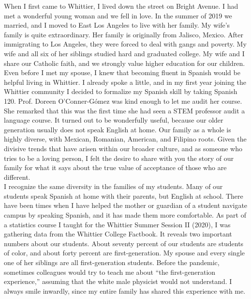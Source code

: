 \documentclass[../../main.tex]{subfiles}
\begin{document}
When I first came to Whittier, I lived down the street on Bright Avenue.  I had met a wonderful young woman and we fell in love.  In the summer of 2019 we married, and I moved to East Los Angeles to live with her family.  My wife's family is quite extraordinary.  Her family is originally from Jalisco, Mexico.  After immigrating to Los Angeles, they were forced to deal with gangs and poverty.  My wife and all six of her siblings studied hard and graduated college.  My wife and I share our Catholic faith, and we strongly value higher education for our children.
\\
\vspace{0.15cm}
Even before I met my spouse, I knew that becoming fluent in Spanish would be helpful living in Whittier.  I already spoke a little, and in my first year joining the Whittier community I decided to formalize my Spanish skill by taking Spanish 120. Prof. Doreen O'Conner-G\'{o}mez was kind enough to let me audit her course.  She remarked that this was the first time she had seen a STEM professor audit a language course.  It turned out to be wonderfully useful, because our older generation usually does not speak English at home.  Our family as a whole is highly diverse, with Mexican, Romanian, American, and Filipino roots.  Given the divisive trends that have arisen within our broader culture, and as someone who tries to be a loving person, I felt the desire to share with you the story of our family for what it says about the true value of acceptance of those who are different.
\\
\vspace{0.15cm}
I recognize the same diversity in the families of my students.  Many of our students speak Spanish at home with their parents, but English at school.  There have been times when I have helped the mother or guardian of a student navigate campus by speaking Spanish, and it has made them more comfortable.  As part of a statistics course I taught for the Whittier Summer Session II (2020), I was gathering data from the Whittier College Factbook.  It reveals two important numbers about our students.  About seventy percent of our students are students of color, and about forty percent are first-generation.  My spouse and every single one of her siblings are all first-generation students.  Before the pandemic, sometimes colleagues would try to teach me about ``the first-generation experience,'' assuming that the white male physicist would not understand.  I always smile inwardly, since my entire family has shared this experience with me.
\\
\end{document}
